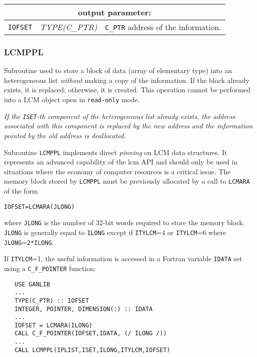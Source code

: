 \vskip 0.8cm

\noindent
\begin{tabular}{|p{1.5cm}|p{3cm}|p{10cm}|}
\hline
\multicolumn{3}{|c|}{\bf output parameter:} \\
\hline
{\tt IOFSET} &  {\it TYPE(C\_PTR)} & {\tt C\_PTR} address of the information. \\
\hline
\end{tabular}

\subsubsection{LCMPPL}

Subroutine used to store a block of data (array of elementary type) into an heterogeneous list
{\sl without} making a copy of the information. If the block already exists, it is replaced;
otherwise, it is created. This operation cannot be performed into a LCM object open in {\tt read-only} mode.

\vskip 0.2cm

{\sl If the {\tt ISET}-th component of the heterogeneous list already exists, the address associated
with this component  is replaced by the new address and the information pointed by the old address
is deallocated.}

\vskip 0.2cm

Subroutine {\tt LCMPPL} implements direct {\sl pinning} on LCM data structures. It represents an advanced capability of the {\sc lcm} API and
should only be used in situations where the economy of computer resources is a critical issue. The memory block stored by {\tt LCMPPL} must be previously
allocated by a call to {\tt LCMARA} of the form
\begin{verbatim}
IOFSET=LCMARA(JLONG)
\end{verbatim}

\noindent where {\tt JLONG} is the number of 32-bit words required to store the memory block. {\tt JLONG} is generally equal to {\tt ILONG} except if
{\tt ITYLCM}=4 or {\tt ITYLCM}=6 where {\tt JLONG}={\tt 2*ILONG}.

\vskip 0.2cm

If {\tt ITYLCM}=1, the useful information is accessed in a Fortran variable {\tt IDATA} set using a {\tt C\_F\_POINTER} function:
\begin{verbatim}
   USE GANLIB
   ...
   TYPE(C_PTR) :: IOFSET
   INTEGER, POINTER, DIMENSION(:) :: IDATA
   ...
   IOFSET = LCMARA(ILONG)
   CALL C_F_POINTER(IOFSET,IDATA, (/ ILONG /))
   ...
   CALL LCMPPL(IPLIST,ISET,ILONG,ITYLCM,IOFSET)
\end{verbatim}

